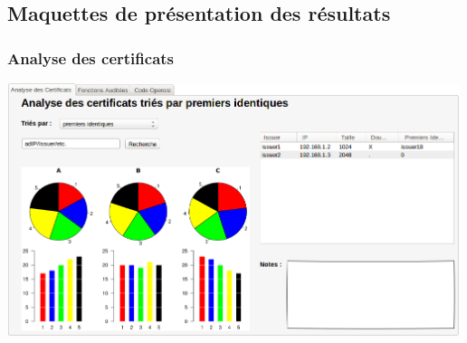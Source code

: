 \documentclass[a4paper,11pt,french]{article}
\begin{document}
\subsection{Maquettes de présentation des résultats}

\subsubsection{Analyse des certificats}
\begin{center}
\includegraphics[width=500px]{Framework/AnalyseCertificats.png}
\end{center}
\end{document}
